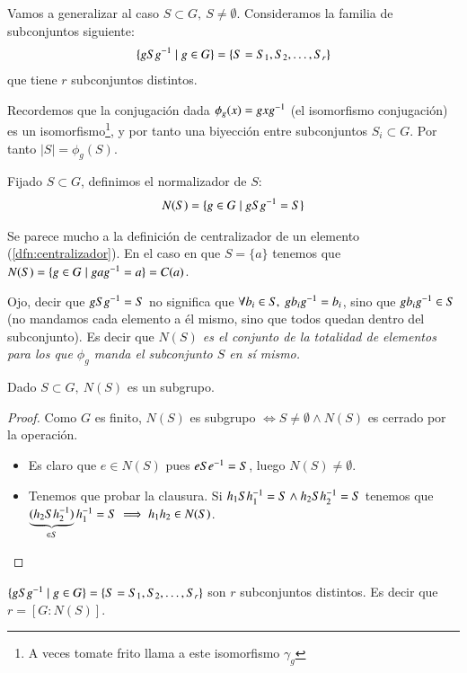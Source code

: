 Vamos a generalizar al caso $S \subset G,\ S \neq \emptyset$. Consideramos la familia de subconjuntos siguiente:
\begin{align*}
\{gSg^{-1} \mid g \in G\} = \{S = S_1, S_2, \dots, S_r\}
\end{align*}
que tiene $r$ subconjuntos distintos.

Recordemos que la conjugación dada $\phi_g(x) = gxg^{-1}$ (el isomorfismo conjugación) es un isomorfismo\footnote{A veces tomate frito llama a este isomorfismo $\gamma_g$}, y por tanto una biyección entre subconjuntos $S_i \subset G$. Por tanto $|S| = \phi_g(S)$.

\begin{dfn}
	\label{dfn:normalizador}
	Fijado $S \subset G$, definimos el normalizador de $S$:
	\begin{align}
	N(S) = \{g \in G \mid gSg^{-1} = S\}
	\end{align} 
\end{dfn}

Se parece mucho a la definición de centralizador de un elemento (\autoref{dfn:centralizador}). En el caso en que $S = \{a\}$ tenemos que $N(S) = \{g \in G \mid gag^{-1} = a\} = C(a)$.

Ojo, decir que $gSg^{-1} = S$ no significa que $\forall b_i \in S,\ gb_ig^{-1} = b_i$, sino que $gb_ig^{-1} \in S$ (no mandamos cada elemento a él mismo, sino que todos quedan dentro del subconjunto). Es decir que \textit{$N(S)$ es el conjunto de la totalidad de elementos para los que $\phi_g$ manda el subconjunto $S$ en sí mismo.}

\begin{pro}
	Dado $S \subset G,\ N(S)$ es un subgrupo.
\end{pro}

\begin{proof} Como $G$ es finito, $N(S)$ es subgrupo $\iff S \neq \emptyset \land N(S)$ es cerrado por la operación.
	\begin{itemize}
		\item Es claro que $e \in N(S)$ pues $eSe^{-1} = S$, luego $N(S) \neq \emptyset$.
		\item Tenemos que probar la clausura. Si $h_1Sh_1^{-1} = S \land h_2Sh_2^{-1} = S$ tenemos que $\underbrace{(h_2Sh_2^{-1})}_{\in S}h_1^{-1} = S \implies h_1h_2 \in N(S)$.
	\end{itemize}
\end{proof}

\begin{pro}
	\label{pro:propiedad2Ns}
	$\{gSg^{-1} \mid g \in G\} = \{S = S_1, S_2, \dots, S_r\}$ son $r$ subconjuntos distintos. Es decir que $r = [G: N(S)]$.
\end{pro}

